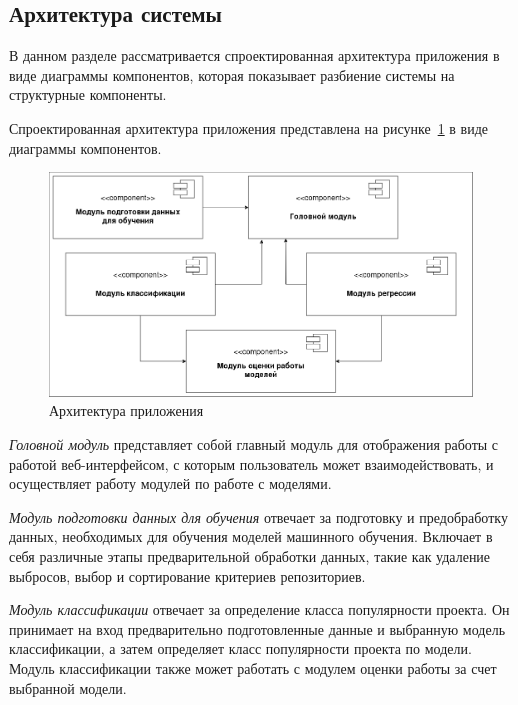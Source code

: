 \subsection{Архитектура системы}
\label{sec:Architecture}
В данном разделе рассматривается спроектированная архитектура приложения в виде диаграммы компонентов, которая показывает разбиение системы на структурные компоненты.

Спроектированная архитектура приложения представлена на рисунке~\ref{ris:architecture} в виде диаграммы компонентов.

\begin{figure}[h]
    \centering
    \includegraphics[width=1\linewidth]{pic/architecture.png}
    \vspace{-1em}\caption{Архитектура приложения}
    \label{ris:architecture}
\end{figure}
\vspace{1em}

\textit{Головной модуль} представляет собой главный модуль для отображения работы с работой веб-интерфейсом, с которым пользователь может взаимодействовать, и осуществляет работу модулей по работе с моделями.

\textit{Модуль подготовки данных для обучения} отвечает за подготовку и предобработку данных, необходимых для обучения моделей машинного обучения. Включает в себя различные этапы предварительной обработки данных, такие как удаление выбросов, выбор и сортирование критериев репозиториев.

\textit{Модуль классификации} отвечает за определение класса популярности проекта. Он принимает на вход предварительно подготовленные данные и выбранную модель классификации, а затем определяет класс популярности проекта по модели. Модуль классификации также может работать с модулем оценки работы за счет выбранной модели.

